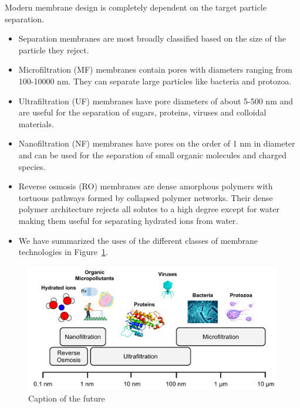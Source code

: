   \noindent Modern membrane design is completely dependent on the target particle 
  separation. 
  \begin{itemize}
    \item Separation membranes are most broadly classified based on the size of 
    the particle they reject.
    \item Microfiltration (MF) membranes contain pores with diameters ranging from 
    100-10000 nm. They can separate large particles like bacteria and protozoa.~\cite{ma_functionalized_2014}
    \item Ultrafiltration (UF) membranes have pore diameters of about 5-500 nm and are useful for the 
    separation of sugars, proteins, viruses and colloidal materials.~\cite{yanful_ultrafiltration_2009}
    \item Nanofiltration (NF) membranes have pores on the order of 1 nm in diameter and can 
    be used for the separation of small organic molecules and charged species.~\cite{van_der_bruggen_review_2003}
    \item Reverse osmosis (RO) membranes are dense amorphous polymers with tortuous 
    pathways formed by collapsed polymer networks. Their dense polymer architecture 
    rejects all solutes to a high degree except for water making them useful for 
    separating hydrated ions from water.~\cite{warsinger_review_2018}
    \item We have summarized the uses of the different classes of membrane technologies in 
    Figure~\ref{fig:size_regimes}.
  \end{itemize}
  
  \begin{figure}
  \centering
  \includegraphics[width=\textwidth]{figs/membrane_separation_size_regimes.pdf}
  \caption{Caption of the future}\label{fig:size_regimes}
  \end{figure}
  
